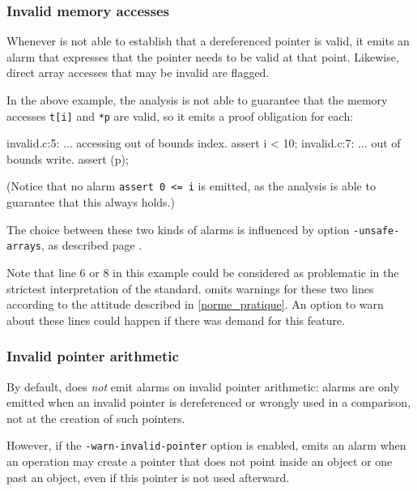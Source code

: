 \documentclass{frama-c-book}
\begin{document}
\subsubsection{Invalid memory accesses}
Whenever \Eva{} is not able to establish that
a dereferenced pointer is valid, it emits an alarm that expresses
that the pointer needs to be valid at that point. Likewise, direct
array accesses that may be invalid are flagged.

In the above example, the analysis is not able to guarantee that
the memory accesses \lstinline|t[i]| and \lstinline|*p| are valid,
so it emits a proof obligation for each:
\begin{logs}
invalid.c:5: ... accessing out of bounds index. assert i < 10;
invalid.c:7: ... out of bounds write. assert \valid(p);
\end{logs}
(Notice that no alarm \lstinline|assert 0 <= i| is emitted, as the
analysis is able to guarantee that this always holds.)


The choice between these two kinds of alarms is influenced by
option \lstinline|-unsafe-arrays|, as described
page \pageref{unsafe-arrays}.

Note that line 6 or 8 in this example could be considered as
problematic in the strictest interpretation of the standard.
\Eva{} omits warnings for these two lines according
to the attitude described in \ref{norme_pratique}. An option
to warn about these lines could happen if there was demand for
this feature.

\subsubsection{Invalid pointer arithmetic}

By default, \Eva{} does \emph{not} emit alarms on invalid pointer arithmetic:
alarms are only emitted when an invalid pointer is dereferenced or wrongly used
in a comparison, not at the creation of such pointers.

However, if the \lstinline|-warn-invalid-pointer| option is enabled,
\Eva{} emits an alarm when an operation may create a pointer that does
not point inside an object or one past an object,
even if this pointer is not used afterward.
\end{document}
